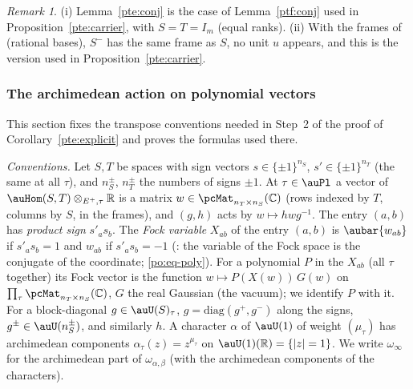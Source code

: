 \documentclass[10pt]{amsart}
\theoremstyle{definition}
\theoremstyle{remark}
\newtheorem{remark}[theorem]{Remark}
\newcommand{\C}{\mathbb C}
\newcommand{\R}{\mathbb R}
\begin{document}
\begin{remark}\label{ptf:rem-conj}
(i) Lemma~\ref{pte:conj} is the case of Lemma~\ref{ptf:conj} used in Proposition~\ref{pte:carrier}, with
$S=T=I_m$ (equal ranks). (ii) With the frames of {\cite[\S2.3]{P53}} (rational bases), $S^-$ has the same frame
as $S$, no unit $u$ appears, and this is the version used in Proposition~\ref{pte:carrier}.
\end{remark}

\subsubsection{The archimedean action on polynomial vectors}\label{ptf:ss-fock}

This section fixes the transpose conventions needed in Step~2 of the proof of
Corollary~\ref{pte:explicit} and proves the formulas used there.

\emph{Conventions.} Let $S,T$ be spaces with sign vectors $s\in\{\pm1\}^{n_S}$, $s'\in\{\pm1\}^{n_T}$ (the
same at all $\tau$), and $n_S^\pm$, $n_T^\pm$ the numbers of signs $\pm1$. At $\tau\in\auPl$ a vector of
$\auHom(S,T)\otimes_{E^+,\tau}\R$ is a matrix $w\in\pcMat_{n_T\times n_S}(\C)$ (rows indexed by $T$,
columns by $S$, in the frames), and $(g,h)$ acts by $w\mapsto hwg^{-1}$. The entry $(a,b)$ has
\emph{product sign} $s'_as_b$. The \emph{Fock variable} $X_{ab}$ of the entry $(a,b)$ is $\aubar{w_{ab}}$ if
$s'_as_b=1$ and $w_{ab}$ if $s'_as_b=-1$ ({\cite[\S5.1.1]{P49}}: the variable of the Fock space is the
conjugate of the coordinate; \eqref{po:eq-poly}). For a polynomial $P$ in the $X_{ab}$ (all $\tau$
together) its Fock vector is the function $w\mapsto P(X(w))\,G(w)$ on $\prod_\tau\pcMat_{n_T\times
n_S}(\C)$, $G$ the real Gaussian (the vacuum); we identify $P$ with it. For a block-diagonal $g\in\auU(S)_
\tau$, $g=\mathrm{diag}(g^+,g^-)$ along the signs, $g^\pm\in\auU(n_S^\pm)$, and similarly $h$. A character
$\alpha$ of $\auU(1)$ of weight $(\mu_\tau)$ has archimedean components $\alpha_\tau(z)=z^{\mu_\tau}$ on
$\auU(1)(\R)=\{|z|=1\}$. We write $\omega_\infty$ for the archimedean part of $\omega_{\alpha,\beta}$ (with the
archimedean components of the characters).
\end{document}
